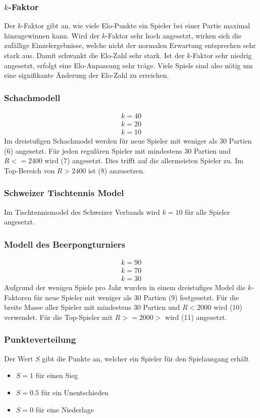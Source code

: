 \documentclass[a4paper, 12pt]{article}
\newcounter{arti}
\begin{document}
\subsubsection{\(k\)-Faktor}
Der \(k\)-Faktor gibt an, wie viele Elo-Punkte ein Spieler bei einer Partie maximal hinzugewinnen kann.
Wird der \(k\)-Faktor sehr hoch angesetzt, wirken sich die zufällige Einzelergebnisse, welche nicht der normalen Erwartung entsprechen sehr stark aus. Damit schwankt die Elo-Zahl sehr stark.
Ist der \(k\)-Faktor sehr niedrig angesetzt, erfolgt eine Elo-Anpassung sehr träge. Viele Spiele sind also nötig um eine signifikante Änderung der Elo-Zahl zu erreichen.
\subsubsection{Schachmodell}
\begin{align}
k=40
\\k=20
\\k=10
\end{align}
Im dreistufigen Schachmodel werden für neue Spieler mit weniger als 30 Partien (6) angesetzt.
Für jeden regulären Spieler mit mindestens 30 Partien und \(R <= 2400\) wird (7) angesetzt. Dies trifft auf die allermeisten Spieler zu.
Im Top-Bereich von \(R > 2400 \) ist (8) anzusetzen.
\subsubsection{Schweizer Tischtennis Model}
Im Tischtennismodel des Schweizer Verbands wird \(k=10\) für alle Spieler angesetzt.
\subsubsection{Modell des Beerpongturniers}
\begin{align}
k=90
\\k=70
\\k=30
\end{align}
Aufgrund der wenigen Spiele pro Jahr wurden in einem dreistufiges Model die \(k\)-Faktoren für neue Spieler mit weniger als 30 Partien (9) festgesetzt. Für die breite Masse aller Spieler mit mindestens 30 Partien und \(R< 2000\) wird (10) verwendet. Für die Top-Spieler mit \(R>=2000>\) wird (11) angesetzt.
\subsubsection{Punkteverteilung}
Der Wert \(S\) gibt die Punkte an, welcher ein Spieler für den Spielausgang erhält
\begin{itemize}
\item \(S = 1\) für einen Sieg
\item \(S = 0.5\) für ein Unentschieden
\item \(S = 0\) für eine Niederlage
\end{itemize}
\end{document}
